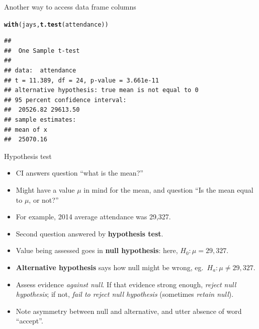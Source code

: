 \documentclass[unknownkeysallowed]{beamer}\usepackage[]{graphicx}\usepackage[]{color}
\makeatletter
\newcommand{\hlstd}[1]{\textcolor[rgb]{0.345,0.345,0.345}{#1}}%
\newcommand{\hlkwd}[1]{\textcolor[rgb]{0.737,0.353,0.396}{\textbf{#1}}}%
\newenvironment{kframe}{%
 \def\at@end@of@kframe{}%
 \ifinner\ifhmode%
  \def\at@end@of@kframe{\end{minipage}}%
  \begin{minipage}{\columnwidth}%
 \fi\fi%
 \def\FrameCommand##1{\hskip\@totalleftmargin \hskip-\fboxsep
 \colorbox{shadecolor}{##1}\hskip-\fboxsep
     \hskip-\linewidth \hskip-\@totalleftmargin \hskip\columnwidth}%
 \MakeFramed {\advance\hsize-\width
   \@totalleftmargin\z@ \linewidth\hsize
   \@setminipage}}%
 {\par\unskip\endMakeFramed%
 \at@end@of@kframe}
\newenvironment{knitrout}{}{} %
\makeatother
\begin{document}
\begin{frame}[fragile]{Another way to access data frame columns}
  
\begin{knitrout}
\color{fgcolor}\begin{kframe}
\begin{alltt}
\hlkwd{with}\hlstd{(jays,}\hlkwd{t.test}\hlstd{(attendance))}
\end{alltt}
\begin{verbatim}
## 
## 	One Sample t-test
## 
## data:  attendance
## t = 11.389, df = 24, p-value = 3.661e-11
## alternative hypothesis: true mean is not equal to 0
## 95 percent confidence interval:
##  20526.82 29613.50
## sample estimates:
## mean of x 
##  25070.16
\end{verbatim}
\end{kframe}
\end{knitrout}
  
\end{frame}

\begin{frame}[fragile]{Hypothesis test}
  
  \begin{itemize}
  \item CI answers question ``what is the mean?''
  \item Might have a value $\mu$ in mind for the mean, and question
    ``Is the mean equal to $\mu$, or not?''
  \item For example, 2014 average attendance was 29,327. 
  \item Second question answered by \textbf{hypothesis test}.
  \item Value being assessed goes in \textbf{null hypothesis}: here,
    $H_0: \mu=29,327$.
  \item \textbf{Alternative hypothesis} says how null might be wrong,
    eg.\ $H_a: \mu \ne 29,327$.
  \item Assess evidence \emph{against null}. If that evidence strong
    enough, \emph{reject null hypothesis}; if not, \emph{fail to
      reject null hypothesis} (sometimes \emph{retain null}). 
  \item Note asymmetry between null and alternative, and utter absence
    of word ``accept''. 
  \end{itemize}
  
\end{frame}
\end{document}
